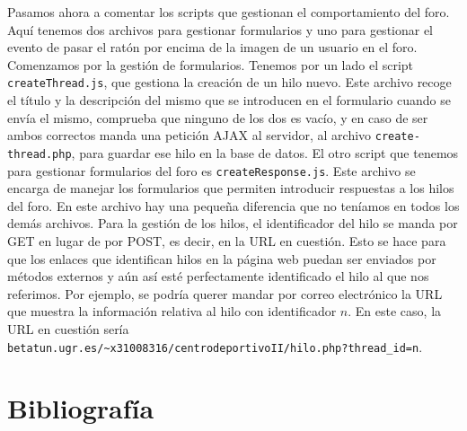 \documentclass[11pt]{article}
\theoremstyle{plain}
\theoremstyle{definition}
\begin{document}
Pasamos ahora a comentar los scripts que gestionan el comportamiento
del foro. Aquí tenemos dos archivos para gestionar formularios y uno
para gestionar el evento de pasar el ratón por encima de la imagen de
un usuario en el foro. Comenzamos por la gestión de formularios.
Tenemos por un lado el script \texttt{createThread.js}, que gestiona
la creación de un hilo nuevo. Este archivo recoge el título y la
descripción del mismo que se introducen en el formulario cuando se
envía el mismo, comprueba que ninguno de los dos es vacío, y en caso
de ser ambos correctos manda una petición AJAX al servidor, al archivo
\texttt{create-thread.php}, para guardar ese hilo en la base de datos.
El otro script que tenemos para gestionar formularios del foro es
\texttt{createResponse.js}. Este archivo se encarga de manejar los
formularios que permiten introducir respuestas a los hilos del foro.
En este archivo hay una pequeña diferencia que no teníamos en todos
los demás archivos. Para la gestión de los hilos, el identificador del
hilo se manda por GET en lugar de por POST, es decir, en la URL en
cuestión. Esto se hace para que los enlaces que identifican hilos en
la página web puedan ser enviados por métodos externos y aún así esté
perfectamente identificado el hilo al que nos referimos. Por ejemplo,
se podría querer mandar por correo electrónico la URL que muestra la
información relativa al hilo con identificador $n$. En este caso, la
URL en cuestión sería
\texttt{betatun.ugr.es/\textasciitilde x31008316/centrodeportivoII/hilo.php?thread\_id=n}.

\section{Bibliografía}

\printbibliography
\end{document}
